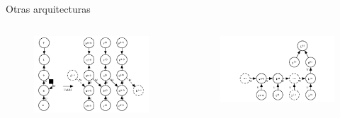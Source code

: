 
\begin{frame}{Otras arquitecturas}

    \begin{columns}
        \centering
        \begin{figure}
            \centering
            \includegraphics[width=1\linewidth]{Images/rnn tipo.png}
        \end{figure}
    
    
        \centering
        \begin{figure}
            \centering
            \includegraphics[width=1\linewidth]{Images/rnn tercer tipo.png}
        
        \end{figure}
    \end{columns}
\end{frame}



